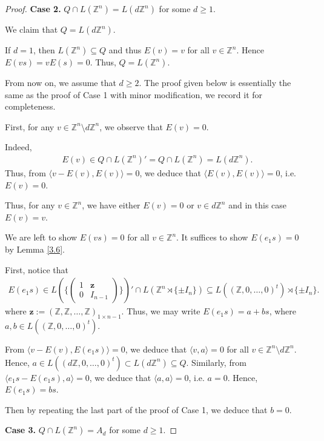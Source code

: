 \documentclass[12pt]{amsart}
\theoremstyle{definition}
\theoremstyle{remark}
\begin{document}
\begin{proof}
\textbf{Case 2.} $Q\cap L(\mathbb{Z}^n)=L(d\mathbb{Z}^n)$ for some $d\geq 1$.

We claim that $Q=L(d\mathbb{Z}^n)$. 

If $d=1$, then $L(\mathbb{Z}^n)\subseteq Q$ and thus $E(v)=v$ for all $v\in\mathbb{Z}^n$. Hence  $E(vs)=vE(s)=0$. Thus, $Q=L(\mathbb{Z}^n)$.

From now on, we assume that $d\geq 2$.
The proof given below is essentially the same as the proof of Case 1 with minor modification, we record it for completeness.

First, for any $v\in\mathbb{Z}^n\setminus {d\mathbb{Z}^n}$, we observe that $E(v)=0$.

Indeed, 
\begin{align*}
E(v)\in Q\cap L(\mathbb{Z}^n)'=Q\cap L(\mathbb{Z}^n)=L(d\mathbb{Z}^n).
\end{align*}
Thus, from $\langle v-E(v), E(v)\rangle=0$, we deduce that $\langle E(v), E(v) \rangle=0$, i.e. $E(v)=0$.

Thus, for any $v\in \mathbb{Z}^n$, we have either $E(v)=0$ or $v\in d\mathbb{Z}^n$ and in this case $E(v)=v$.

We are left to show $E(vs)=0$ for all $v\in\mathbb{Z}^n$. It suffices to show $E(e_1s)=0$ by Lemma \ref{3.6}.

First, notice that
\begin{align*}
E(e_1s)\in L(\{\left(\begin{smallmatrix}
1&\boldsymbol{z}\\
0&I_{n-1}
\end{smallmatrix}\right) \})'\cap L(\mathbb{Z}^n\rtimes \{\pm I_{n}\})\subseteq L((\mathbb{Z},0,\dots, 0)^t)\rtimes \{\pm I_{n}\}.
\end{align*}
where $\boldsymbol{z}:=(\mathbb{Z},\mathbb{Z},\dots,\mathbb{Z})_{1\times n-1}$.
Thus, we may write $E(e_1s)=a+bs$, where $a, b\in L((\mathbb{Z},0,\dots, 0)^t)$.

From $\langle v-E(v), E(e_1s)\rangle=0$, we deduce that $\langle v, a \rangle=0$ for all $v\in \mathbb{Z}^n\setminus {d\mathbb{Z}^n}$. Hence, $a\in L((d\mathbb{Z},0,\dots,0)^t)\subset L(d\mathbb{Z}^n)\subseteq Q$. Similarly, from $\langle e_1s-E(e_1s), a \rangle=0$, we deduce that $\langle a, a \rangle=0$, i.e. $a=0$.
Hence, $E(e_1s)=bs$.

Then by repeating the last part of the proof of Case 1, we deduce that $b=0$. 


\textbf{Case 3.} $Q\cap L(\mathbb{Z}^n)=A_d$ for some $d\geq 1$.


\end{proof}
\end{document}
